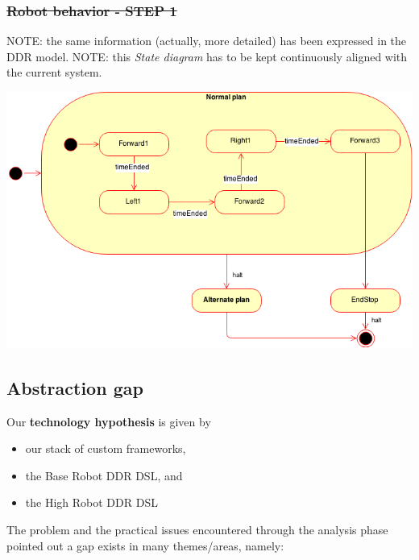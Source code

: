 \documentclass[11pt]{article}
\begin{document}
\subsubsection{\st{Robot behavior - STEP 1}}

NOTE: the same information (actually, more detailed) has been expressed in the 
	DDR model.
NOTE: this \emph{State diagram} has to be kept continuously aligned with the
    current system.

\includegraphics[scale=0.6]{img/ISS-robotStep1-FSM.png}


\subsection{Abstraction gap}


Our \textbf{technology hypothesis} is given by 

\begin{itemize}
  \item our stack of custom frameworks,
  \item the Base Robot DDR DSL, and
  \item the High Robot DDR DSL
\end{itemize}


The problem and the practical issues encountered through the analysis phase
pointed out a gap exists in many themes/areas, namely:
\end{document}
